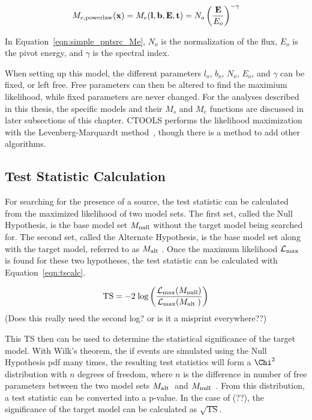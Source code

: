   \begin{equation}\label{eqn:simple_pntsrc_Me}
    M_{e,\textrm{powerlaw}}(\mathbf{x }) = M_e(\mathbf{l },\mathbf{b },\mathbf{E },\mathbf{t }) = N_o \left ( \frac{\mathbf{E }}{E_o} \right )^{-\gamma}
  \end{equation}
  
  In Equation~\ref{eqn:simple_pntsrc_Me}, $N_o$ is the normalization of the flux, $E_o$ is the pivot energy, and $\gamma$ is the spectral index.
  
  When setting up this model, the different parameters $l_o$, $b_o$, $N_o$, $E_o$, and $\gamma$ can be fixed, or left free.
  Free parameters can then be altered to find the maximium likelihood, while fixed parameters are never changed.
  For the analyses described in this thesis, the specific models and their $M_s$ and $M_e$ functions are discussed in later subsections of this chapter.
  CTOOLS performs the likelihood maximization with the Levenberg-Marquardt method~\cite{marquardt1963algorithm}, though there is a method to add other algorithms.
  
  
  \subsection{Test Statistic Calculation}
  
  For searching for the presence of a source, the test statistic can be calculated from the maximized likelihood of two model sets.
  The first set, called the Null Hypothesis, is the base model set $M_\textrm{null}$ without the target model being searched for.
  The second set, called the Alternate Hypothesis, is the base model set along with the target model, referred to as $M_\textrm{alt }$.
  Once the maximum likelihood $\mathcal{L}_{\textrm{max}}$ is found for these two hypotheses, the test statistic can be calculated with Equation~\ref{eqn:tscalc}.
  
  \begin{equation}\label{eqn:tscalc}
    \textrm{TS} = - 2 \; \textrm{log} \left (  \frac{ \mathcal{L}_{\textrm{max}}( M_\textrm{null} ) }{ \mathcal{L}_{\textrm{max}}( M_\textrm{alt } ) } \right )
  \end{equation}
  {\color{red}(Does this really need the second log? or is it a misprint everywhere??)}
  
  This TS then can be used to determine the statistical significance of the target model.
  With Wilk's theorem, the if events are simulated using the Null Hypothesis pdf many times, the resulting test statistics will form a $\Chi^2$ distribution with $n$ degrees of freedom, where $n$ is the difference in number of free parameters between the two model sets $M_\textrm{alt }$ and $M_\textrm{null}$~\cite{wilks1938}.
  From this distribution, a test statistic can be converted into a p-value.
  In the case of {\color{red}(??)}, the significance of the target model can be calculated as $\sqrt{\textrm{TS}}$.
  
